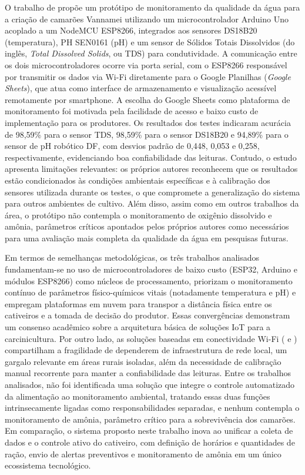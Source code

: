 \documentclass[11pt,a4paper]{article}
\begin{document}
O trabalho de \cite{Arifani2024} propõe um protótipo de monitoramento da qualidade da água para a criação de camarões Vannamei utilizando um microcontrolador Arduino Uno acoplado a um NodeMCU ESP8266, integrados aos sensores DS18B20 (temperatura), PH SEN0161 (pH) e um sensor de Sólidos Totais Dissolvidos (do inglês, \textit{Total Dissolved Solids}, ou TDS) para condutividade. A comunicação entre os dois microcontroladores ocorre via porta serial, com o ESP8266 responsável por transmitir os dados via Wi-Fi diretamente para o Google Planilhas (\textit{Google Sheets}), que atua como interface de armazenamento e visualização acessível remotamente por smartphone. A escolha do Google Sheets como plataforma de monitoramento foi motivada pela facilidade de acesso e baixo custo de implementação para os produtores. Os resultados dos testes indicaram acurácia de 98,59\% para o sensor TDS, 98,59\% para o sensor DS18B20 e 94,89\% para o sensor de pH robótico DF, com desvios padrão de 0,448, 0,053 e 0,258, respectivamente, evidenciando boa confiabilidade das leituras. Contudo, o estudo apresenta limitações relevantes: os próprios autores reconhecem que os resultados estão condicionados às condições ambientais específicas e à calibração dos sensores utilizada durante os testes, o que compromete a generalização do sistema para outros ambientes de cultivo. Além disso, assim como em outros trabalhos da área, o protótipo não contempla o monitoramento de oxigênio dissolvido e amônia, parâmetros críticos apontados pelos próprios autores como necessários para uma avaliação mais completa da qualidade da água em pesquisas futuras.
 
Em termos de semelhanças metodológicas, os três trabalhos analisados fundamentam-se no uso de microcontroladores de baixo custo (ESP32, Arduino e módulos ESP8266) como núcleos de processamento, priorizam o monitoramento contínuo de parâmetros físico-químicos vitais (notadamente temperatura e pH) e empregam plataformas em nuvem para transpor a distância física entre os cativeiros e a tomada de decisão do produtor. Essas convergências demonstram um consenso acadêmico sobre a arquitetura básica de soluções IoT para a carcinicultura. Por outro lado, as soluções baseadas em conectividade Wi-Fi (\cite{Uddin2020} e \cite{Arifani2024}) compartilham a fragilidade de dependerem de infraestrutura de rede local, um gargalo relevante em áreas rurais isoladas, além da necessidade de calibração manual recorrente para manter a confiabilidade das leituras. Entre os trabalhos analisados, não foi identificada uma solução que integre o controle automatizado da alimentação ao monitoramento ambiental, tratando essas duas funções intrinsecamente ligadas como responsabilidades separadas, e nenhum contempla o monitoramento de amônia, parâmetro crítico para a sobrevivência dos camarões. Em comparação, o sistema proposto neste trabalho inova ao unificar a coleta de dados e o controle ativo do cativeiro, com definição de horários e quantidades de ração, envio de alertas preventivos e monitoramento de amônia em um único ecossistema tecnológico.
\end{document}
